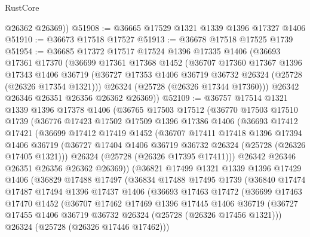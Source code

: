 \begin{lexlean}{RustCore}
\begin{coremodule}
        @26362
        @26369))
@51908 := @36665 @17529 @1321 @1339 @1396 @17327 @1406
@51910 := @36673 @17518 @17527
@51913 := @36678 @17518 @17525 @1739
@51954 := @36685
    @17372
    @17517
    @17524
    @1396
    @17335
    @1406
    (@36693
      @17361
      @17370
      (@36699
        @17361
        @17368
        @1452
        (@36707
          @17360
          @17367
          @1396
          @17343
          @1406
          @36719
          (@36727 @17353 @1406 @36719 @36732 @26324 (@25728 (@26326 @17354 @1321)))
          @26324
          (@25728 (@26326 @17344 @17360)))
        @26342
        @26346
        @26351
        @26356
        @26362
        @26369))
@52109 := @36757
    @17514
    @1321
    @1339
    @1396
    @17378
    @1406
    (@36765
      @17503
      @17512
      (@36770
        @17503
        @17510
        @1739
        (@36776
          @17423
          @17502
          @17509
          @1396
          @17386
          @1406
          (@36693
            @17412
            @17421
            (@36699
              @17412
              @17419
              @1452
              (@36707
                @17411
                @17418
                @1396
                @17394
                @1406
                @36719
                (@36727 @17404 @1406 @36719 @36732 @26324 (@25728 (@26326 @17405 @1321)))
                @26324
                (@25728 (@26326 @17395 @17411)))
              @26342
              @26346
              @26351
              @26356
              @26362
              @26369))
          (@36821
            @17499
            @1321
            @1339
            @1396
            @17429
            @1406
            (@36829
              @17488
              @17497
              (@36834
                @17488
                @17495
                @1739
                (@36840
                  @17474
                  @17487
                  @17494
                  @1396
                  @17437
                  @1406
                  (@36693
                    @17463
                    @17472
                    (@36699
                      @17463
                      @17470
                      @1452
                      (@36707
                        @17462
                        @17469
                        @1396
                        @17445
                        @1406
                        @36719
                        (@36727 @17455 @1406 @36719 @36732 @26324 (@25728 (@26326 @17456 @1321)))
                        @26324
                        (@25728 (@26326 @17446 @17462)))

\end{coremodule}
\end{lexlean}
